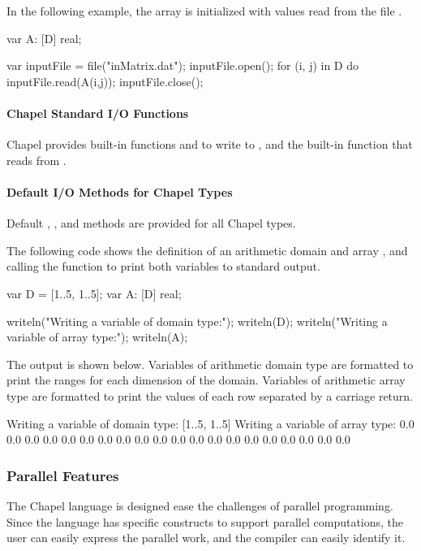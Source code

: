 \begin{example}
In the following example, the array  is initialized with
values read from the file .
\begin{chapel}
var A: [D] real;

var inputFile = file("inMatrix.dat");
inputFile.open();
for (i, j) in D do inputFile.read(A(i,j));
inputFile.close();
\end{chapel}
\end{example}

\paragraph{Chapel Standard I/O Functions}
Chapel provides built-in functions  and 
to write to , and the built-in function 
that reads from .

\paragraph{Default I/O Methods for Chapel Types}
Default , , and  methods are 
provided for all Chapel types.  

\begin{example}
The following code shows the definition of an arithmetic domain 
and array , and calling the  function
to print both variables to standard output.  
\begin{chapel}
var D = [1..5, 1..5];
var A: [D] real;

writeln("Writing a variable of domain type:");
writeln(D);
writeln("Writing a variable of array type:");
writeln(A);
\end{chapel}

The output is shown below.  Variables of arithmetic domain type are 
formatted to print the ranges for each dimension of the domain.  Variables
of arithmetic array type are formatted to print the values of each row
separated by a carriage return.
\begin{commandline}
Writing a variable of domain type:
[1..5, 1..5]
Writing a variable of array type:
0.0 0.0 0.0 0.0 0.0
0.0 0.0 0.0 0.0 0.0
0.0 0.0 0.0 0.0 0.0
0.0 0.0 0.0 0.0 0.0
\end{commandline}
\end{example}

\subsubsection{Parallel Features}
The Chapel language is designed ease the challenges of parallel 
programming.  Since the language has specific constructs to support
parallel computations, the user can easily express the parallel 
work, and the compiler can easily identify it.

